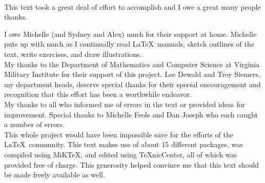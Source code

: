 \Huge
{}\\

\vspace{1in}
\normalsize

This text took a great deal of effort to accomplish and I owe a great many people thanks. \\
\bigskip

I owe Michelle (and Sydney and Alex) much for their support at home. Michelle puts up with much as I continually read \LaTeX\ manuals, sketch outlines of the text, write exercises, and draw illustrations.\\

My thanks to the Department of Mathematics and Computer Science at Virginia Military Institute for their support of this project. Lee Dewald and Troy Siemers, my department heads, deserve special thanks for their special encouragement and recognition that this effort has been a worthwhile endeavor.\\

My thanks to all who informed me of errors in the text or provided ideas for improvement. Special thanks to Michelle Feole and Dan Joseph who each caught a number of errors.\\

This whole project would have been impossible save for the efforts of the \LaTeX\ community. This text makes use of about 15 different packages, was compiled using MiK\TeX, and edited using \TeX nicCenter, all of which was provided free of charge. This generosity helped convince me that this text should be made freely available as well.
